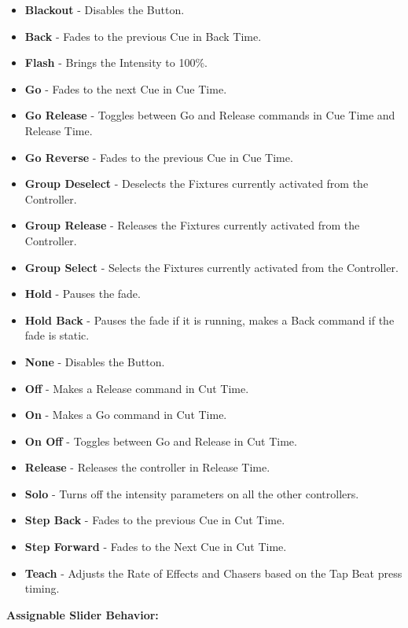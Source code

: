 \documentclass[
]{article}
\begin{document}
\begin{itemize}
\item
  \textbf{Blackout} - Disables the Button.
\item
  \textbf{Back} - Fades to the previous Cue in Back Time.
\item
  \textbf{Flash} - Brings the Intensity to 100\%.
\item
  \textbf{Go} - Fades to the next Cue in Cue Time.
\item
  \textbf{Go Release} - Toggles between Go and Release commands in Cue Time and Release Time.
\item
  \textbf{Go Reverse} - Fades to the previous Cue in Cue Time.
\item
  \textbf{Group Deselect} - Deselects the Fixtures currently activated from the Controller.
\item
  \textbf{Group Release} - Releases the Fixtures currently activated from the Controller.
\item
  \textbf{Group Select} - Selects the Fixtures currently activated from the Controller.
\item
  \textbf{Hold} - Pauses the fade.
\item
  \textbf{Hold Back} - Pauses the fade if it is running, makes a Back command if the fade is static.
\item
  \textbf{None} - Disables the Button.
\item
  \textbf{Off} - Makes a Release command in Cut Time.
\item
  \textbf{On} - Makes a Go command in Cut Time.
\item
  \textbf{On Off} - Toggles between Go and Release in Cut Time.
\item
  \textbf{Release} - Releases the controller in Release Time.
\item
  \textbf{Solo} - Turns off the intensity parameters on all the other controllers.
\item
  \textbf{Step Back} - Fades to the previous Cue in Cut Time.
\item
  \textbf{Step Forward} - Fades to the Next Cue in Cut Time.
\item
  \textbf{Teach} - Adjusts the Rate of Effects and Chasers based on the Tap Beat press timing.
\end{itemize}

\textbf{Assignable Slider Behavior:}
\end{document}
